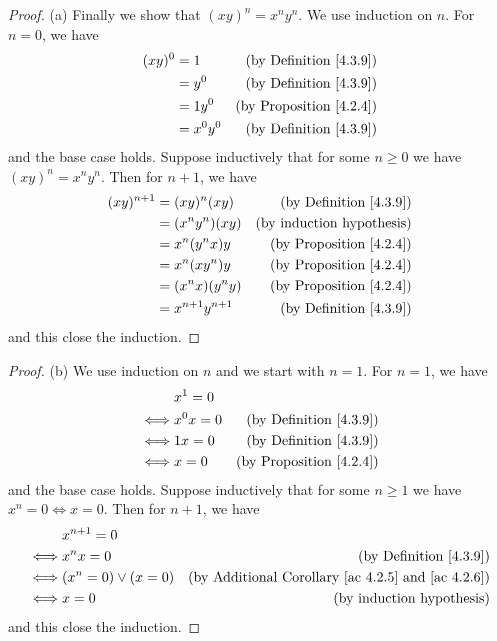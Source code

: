 \begin{proof}{(a)}
    Finally we show that \((xy)^n = x^n y^n\).
    We use induction on \(n\).
    For \(n = 0\), we have
    \begin{align*}
        (xy)^0 & = 1       & \text{(by Definition \ref{4.3.9})}  \\
               & = y^0     & \text{(by Definition \ref{4.3.9})}  \\
               & = 1y^0    & \text{(by Proposition \ref{4.2.4})} \\
               & = x^0 y^0 & \text{(by Definition \ref{4.3.9})}
    \end{align*}
    and the base case holds.
    Suppose inductively that for some \(n \geq 0\) we have \((xy)^n = x^n y^n\).
    Then for \(n + 1\), we have
    \begin{align*}
        (xy)^{n + 1} & = (xy)^n (xy)         & \text{(by Definition \ref{4.3.9})}  \\
                     & = (x^n y^n) (xy)      & \text{(by induction hypothesis)}    \\
                     & = x^n (y^n x) y       & \text{(by Proposition \ref{4.2.4})} \\
                     & = x^n (x y^n) y       & \text{(by Proposition \ref{4.2.4})} \\
                     & = (x^n x)(y^n y)      & \text{(by Proposition \ref{4.2.4})} \\
                     & = x^{n + 1} y^{n + 1} & \text{(by Definition \ref{4.3.9})}
    \end{align*}
    and this close the induction.
\end{proof}

\begin{proof}{(b)}
    We use induction on \(n\) and we start with \(n = 1\).
    For \(n = 1\), we have
    \begin{align*}
             & x^1 = 0                                         \\
        \iff & x^0 x = 0 & \text{(by Definition \ref{4.3.9})}  \\
        \iff & 1x = 0    & \text{(by Definition \ref{4.3.9})}  \\
        \iff & x = 0     & \text{(by Proposition \ref{4.2.4})}
    \end{align*}
    and the base case holds.
    Suppose inductively that for some \(n \geq 1\) we have \(x^n = 0 \iff x = 0\).
    Then for \(n + 1\), we have
    \begin{align*}
             & x^{n + 1} = 0                                                                               \\
        \iff & x^n x = 0              & \text{(by Definition \ref{4.3.9})}                                 \\
        \iff & (x^n = 0) \lor (x = 0) & \text{(by Additional Corollary \ref{ac 4.2.5} and \ref{ac 4.2.6})} \\
        \iff & x = 0                  & \text{(by induction hypothesis)}
    \end{align*}
    and this close the induction.
\end{proof}

